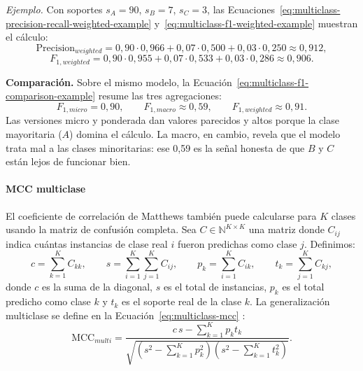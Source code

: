 \documentclass[12pt,oneside]{report}
\begin{document}
\emph{Ejemplo.} Con soportes $s_A=90$, $s_B=7$, $s_C=3$, las Ecuaciones~\eqref{eq:multiclass-precision-recall-weighted-example} y~\eqref{eq:multiclass-f1-weighted-example} muestran el cálculo:
\begin{equation}
\label{eq:multiclass-precision-recall-weighted-example}
\mathrm{Precision}_{weighted}=0{,}90\cdot0{,}966+0{,}07\cdot0{,}500+0{,}03\cdot0{,}250\approx0{,}912,
\end{equation}
\begin{equation}
\label{eq:multiclass-f1-weighted-example}
F_{1,weighted}=0{,}90\cdot 0{,}955+0{,}07\cdot 0{,}533+0{,}03\cdot 0{,}286\approx 0{,}906.
\end{equation}

\textbf{Comparación.} Sobre el mismo modelo, la Ecuación~\eqref{eq:multiclass-f1-comparison-example} resume las tres agregaciones:
\begin{equation}
\label{eq:multiclass-f1-comparison-example}
F_{1,micro}=0{,}90,\qquad F_{1,macro}\approx 0{,}59,\qquad F_{1,weighted}\approx 0{,}91.
\end{equation}
Las versiones micro y ponderada dan valores parecidos y altos porque la clase mayoritaria ($A$) domina el cálculo. La macro, en cambio, revela que el modelo trata mal a las clases minoritarias: ese 0{,}59 es la señal honesta de que $B$ y $C$ están lejos de funcionar bien.

\paragraph{MCC multiclase}

El coeficiente de correlación de Matthews también puede calcularse para $K$ clases usando la matriz de confusión completa. Sea $C\in\mathbb{N}^{K\times K}$ una matriz donde $C_{ij}$ indica cuántas instancias de clase real $i$ fueron predichas como clase $j$. Definimos:
\begin{equation}
\label{eq:multiclass-mcc-defs}
c=\sum_{k=1}^{K} C_{kk},\qquad
s=\sum_{i=1}^{K}\sum_{j=1}^{K} C_{ij},\qquad
p_k=\sum_{i=1}^{K} C_{ik},\qquad
t_k=\sum_{j=1}^{K} C_{kj},
\end{equation}
donde $c$ es la suma de la diagonal, $s$ es el total de instancias, $p_k$ es el total predicho como clase $k$ y $t_k$ es el soporte real de la clase $k$. La generalización multiclase se define en la Ecuación~\eqref{eq:multiclass-mcc} \cite{gorodkin2004,chicco_mcc}:
\begin{equation}
\label{eq:multiclass-mcc}
\mathrm{MCC}_{multi}=\frac{c\,s-\sum_{k=1}^{K} p_k t_k}{\sqrt{\left(s^2-\sum_{k=1}^{K}p_k^2\right)\left(s^2-\sum_{k=1}^{K}t_k^2\right)}}.
\end{equation}
\end{document}
